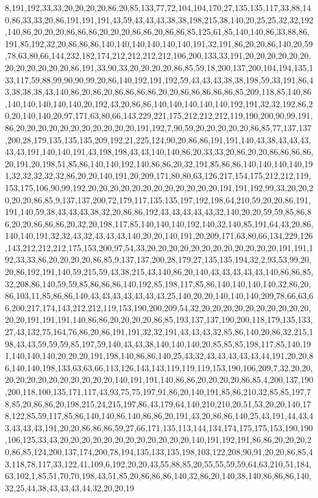 8,191,192,33,33,20,20,20,20,86,20,85,133,77,72,104,104,170,27,135,135,117,33,88,140,86,33,33,20,86,191,191,191,43,59,43,43,43,38,38,198,215,38,140,20,25,25,32,32,192,140,86,20,20,20,86,86,86,20,20,20,86,86,20,86,86,85,125,61,85,140,140,86,33,88,86,191,85,192,32,20,86,86,86,140,140,140,140,140,140,191,32,191,86,20,20,86,140,20,59,78,63,80,66,144,232,182,174,212,212,212,212,106,200,133,33,191,20,20,20,20,20,20,20,20,20,20,20,20,86,191,33,90,33,20,20,20,20,86,85,59,18,200,137,200,104,194,135,133,117,59,88,99,90,90,99,20,86,140,192,191,192,59,43,43,43,38,38,198,59,33,191,86,43,38,38,38,43,140,86,20,86,20,86,86,86,86,20,20,86,86,86,86,86,85,209,118,85,140,86,140,140,140,140,140,20,192,43,20,86,86,140,140,140,140,140,192,191,32,32,192,86,20,20,140,140,20,97,171,63,80,66,143,229,221,175,212,212,212,119,190,200,90,99,191,86,20,20,20,20,20,20,20,20,20,20,20,191,192,7,90,59,20,20,20,20,20,86,85,77,137,137,200,28,179,135,135,135,209,192,21,225,124,90,20,86,86,191,191,140,43,38,43,43,43,43,43,191,140,140,191,43,198,198,43,43,140,140,86,20,33,33,20,86,20,20,86,86,86,86,20,191,20,198,51,85,86,140,140,192,140,86,86,20,32,191,85,86,86,140,140,140,140,191,32,32,32,32,32,86,20,20,140,191,20,209,171,80,80,63,126,217,154,175,212,212,119,153,175,106,90,99,192,20,20,20,20,20,20,20,20,20,20,20,20,191,191,192,99,33,20,20,20,20,20,86,85,9,137,137,200,72,179,117,135,135,197,192,198,64,210,59,20,20,86,191,191,140,59,38,43,43,43,38,32,20,86,86,192,43,43,43,43,43,32,140,20,20,59,59,85,86,86,20,20,86,86,86,20,32,20,198,117,85,140,140,140,192,140,32,140,85,191,64,43,20,86,140,140,191,32,32,43,32,43,43,43,140,20,20,140,191,20,209,171,63,80,66,134,229,126,143,212,212,212,175,153,200,97,54,33,20,20,20,20,20,20,20,20,20,20,20,20,191,191,192,33,33,86,20,20,20,20,86,85,9,137,137,200,28,179,27,135,135,194,32,2,93,53,99,20,20,86,192,191,140,59,215,59,43,38,215,43,140,86,20,140,43,43,43,43,43,140,86,86,85,32,208,86,140,59,59,85,86,86,86,140,192,85,198,117,85,86,140,140,140,140,32,86,20,86,103,11,85,86,86,140,43,43,43,43,43,43,43,25,140,20,20,140,140,140,209,78,66,63,66,200,217,174,143,212,212,119,153,190,200,209,54,32,20,20,20,20,20,20,20,20,20,20,20,20,191,191,191,140,86,86,20,20,20,20,86,85,193,137,137,190,200,118,179,135,133,27,43,132,75,164,76,86,20,86,191,191,32,32,191,43,43,43,32,85,86,140,20,86,32,215,198,43,43,59,59,59,85,197,59,140,43,43,38,140,140,140,20,85,85,85,198,117,85,140,191,140,140,140,20,20,20,191,198,140,86,86,140,25,43,32,43,43,43,43,43,44,191,20,20,86,140,140,198,133,63,63,66,113,126,143,143,119,119,119,153,190,106,209,7,32,20,20,20,20,20,20,20,20,20,20,20,20,140,191,191,140,86,86,20,20,20,20,86,85,4,200,137,190,200,118,100,135,171,117,43,93,75,75,197,91,86,20,140,191,85,86,210,32,85,85,197,78,85,20,86,86,20,198,215,24,215,197,86,43,179,64,140,210,210,20,51,53,20,20,140,178,122,85,59,117,85,86,140,140,86,140,86,86,20,191,43,20,86,86,140,25,43,191,44,43,43,43,43,43,191,20,20,86,86,86,59,27,66,171,135,113,144,134,174,175,175,153,190,190,106,125,33,43,20,20,20,20,20,20,20,20,20,20,20,20,140,191,192,191,86,86,20,20,20,20,86,85,124,200,137,174,200,78,194,135,133,135,198,103,122,208,90,91,20,20,86,85,43,118,78,117,33,122,41,109,6,192,20,20,43,55,88,85,20,55,55,59,59,64,63,210,51,184,63,102,1,85,51,70,70,198,43,51,85,20,86,86,86,140,32,86,20,140,38,140,86,86,86,140,32,25,44,38,43,43,43,44,32,20,20,19